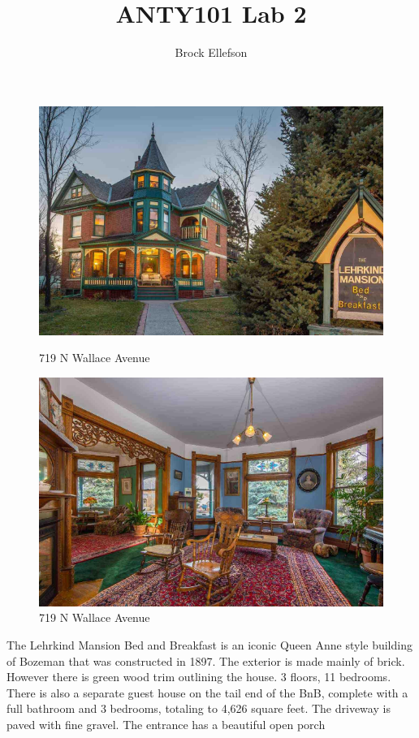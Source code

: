 \documentclass[10pt,letterpaper]{article}
\author{Brock Ellefson}
\title{ANTY101 Lab 2}
\begin{document}
\maketitle
\newpage




\begin{figure}[!tbp]
	\centering
		\begin{minipage}[b]{0.4\textwidth}
			\includegraphics[width=\textwidth]{house1pic1.png}
    		\caption{719 N Wallace Avenue}
  		\end{minipage}
  \hfill
  		\begin{minipage}[b]{0.4\textwidth}
    		\includegraphics[width=\textwidth]{house1pic2.png}
    		\caption{719 N Wallace Avenue}
  		\end{minipage}
\end{figure}

	
The Lehrkind Mansion Bed and Breakfast is an iconic Queen Anne style building of Bozeman that was constructed in 1897. The exterior is made mainly of brick. However there is green wood trim outlining the house. 3 floors, 11 bedrooms. There is also a separate guest house on the tail end of the BnB, complete with a full bathroom and 3 bedrooms, totaling to 4,626 square feet. The driveway is paved with fine gravel. The entrance has a beautiful open porch 
\end{document}

